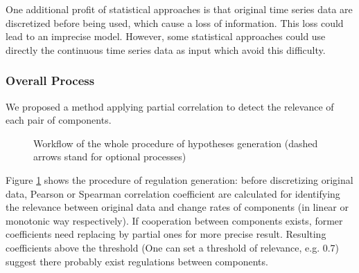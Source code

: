 One additional profit of statistical approaches is that original time series data are discretized before being used, which cause a loss of information.
This loss could lead to an imprecise model.
However, some statistical approaches could use directly the continuous time series data as input which avoid this difficulty.

\subsubsection{Overall Process}
We proposed a method applying partial correlation to detect the relevance of each pair of components.

\begin{figure}[ht]
\centering
{}
\caption[Workflow of model inference via partial correlation]{Workflow of the whole procedure of hypotheses generation (dashed arrows stand for optional processes)}\label{plan}
\end{figure}
Figure \ref{plan} shows the procedure of regulation generation: before discretizing original data, Pearson or Spearman correlation coefficient \cite{samaga2009logic,hauke2011comparison} are calculated for identifying the relevance between original data and change rates of components (in linear or monotonic way respectively). If cooperation between components exists, former coefficients need replacing by partial ones \cite{de2004discovery} for more precise result.
Resulting coefficients above the threshold (One can set a threshold of relevance, e.g. 0.7) suggest there probably exist regulations between components.

